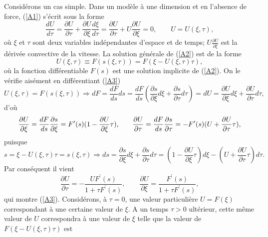\documentclass[10pt,thmsa]{article}
\begin{document}
Consid\'{e}rons un cas simple. Dans un mod\`{e}le \`{a} une dimension et en
l'absence de force, (\ref{A1}) s'\'{e}crit sous la forme
\begin{equation}
\frac{dU}{d\tau}=\frac{\partial U}{\partial\tau}+\frac{\partial U}{\partial
\xi}\frac{d\xi}{d\tau}=\frac{\partial U}{\partial\tau}+U\frac{\partial
U}{\partial\xi}=0,\qquad U=U(\xi,\tau),\label{A2}%
\end{equation}
o\`{u} $\xi$ et $\tau$ sont deux variables ind\'{e}pendantes d'espace et de
temps; $U\frac{\partial U}{\partial\xi}$ est la d\'{e}riv\'{e}e convective de
la vitesse. La solution g\'{e}n\'{e}rale de (\ref{A2}) est de la forme
\begin{equation}
U(\xi,\tau)\equiv F(s(\xi,\tau))=F(\xi-U(\xi,\tau)\tau),\label{A3}%
\end{equation}
o\`{u} la fonction diff\'{e}rentiable $F(s)$ est une solution implicite de
(\ref{A2}). On le v\'{e}rifie ais\'{e}ment en diff\'{e}rentiant (\ref{A3})
\begin{equation}
U(\xi,\tau)=F(s(\xi,\tau))\Rightarrow dF=\frac{dF}{ds}ds=\frac{dF}{ds}%
(\frac{\partial s}{\partial\xi}d\xi+\frac{\partial s}{\partial\tau}%
d\tau)=dU=\frac{\partial U}{\partial\xi}d\xi+\frac{\partial U}{\partial\tau
}d\tau,
\end{equation}
d'o\`{u}
\begin{equation}
\frac{\partial U}{\partial\xi}=\frac{dF}{ds}\frac{\partial s}{\partial\xi
}=F^{\prime}(s)(1-\frac{\partial U}{\partial\xi}\tau)\text{,\qquad}%
\frac{\partial U}{\partial\tau}=\frac{dF}{ds}\frac{\partial s}{\partial\tau
}=-F^{\prime}(s)(U+\frac{\partial U}{\partial\tau}\tau),
\end{equation}
puisque
\begin{equation}
s=\xi-U(\xi,\tau)\tau=s(\xi,\tau)\Rightarrow ds=\frac{\partial s}{\partial\xi
}d\xi+\frac{\partial s}{\partial\tau}d\tau=(1-\frac{\partial U}{\partial\xi
}\tau)d\xi-(U+\frac{\partial U}{\partial\tau}\tau)d\tau.
\end{equation}
Par cons\'{e}quent il vient
\begin{equation}
\frac{\partial U}{\partial\tau}=-\frac{UF^{\prime}(s)}{1+\tau F^{\prime}%
(s)},\qquad\frac{\partial U}{\partial\xi}=\frac{F^{\prime}(s)}{1+\tau
F^{\prime}(s)},\label{A7}%
\end{equation}
qui montre (\ref{A3}). Consid\'{e}rons, \`{a} $\tau=0$, une valeur
particuli\`{e}re $U=F(\xi)$ correspondant \`{a} une certaine valeur de $\xi.$
A un temps $\tau>0$ ult\'{e}rieur, cette m\^{e}me valeur de $U$ correspondra
\`{a} une valeur de $\xi$ telle que la valeur de $F(\xi-U(\xi,\tau)\tau) $ est
\end{document}
